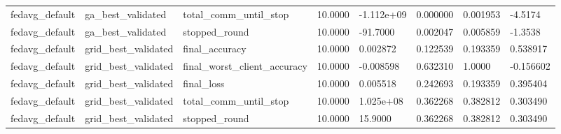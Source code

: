 \documentclass[11pt]{report}
\begin{document}
\begin{longtable}{llllllll}
fedavg\_default & ga\_best\_validated & total\_comm\_until\_stop & 10.0000 & -1.112e+09 & 0.000000 & 0.001953 & -4.5174 \\
fedavg\_default & ga\_best\_validated & stopped\_round & 10.0000 & -91.7000 & 0.002047 & 0.005859 & -1.3538 \\
fedavg\_default & grid\_best\_validated & final\_accuracy & 10.0000 & 0.002872 & 0.122539 & 0.193359 & 0.538917 \\
fedavg\_default & grid\_best\_validated & final\_worst\_client\_accuracy & 10.0000 & -0.008598 & 0.632310 & 1.0000 & -0.156602 \\
fedavg\_default & grid\_best\_validated & final\_loss & 10.0000 & 0.005518 & 0.242693 & 0.193359 & 0.395404 \\
fedavg\_default & grid\_best\_validated & total\_comm\_until\_stop & 10.0000 & 1.025e+08 & 0.362268 & 0.382812 & 0.303490 \\
fedavg\_default & grid\_best\_validated & stopped\_round & 10.0000 & 15.9000 & 0.362268 & 0.382812 & 0.303490 \\
\bottomrule
\end{longtable}
\end{document}
